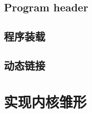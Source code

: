 \documentclass[a4paper,left=2.5cm,right=2.5cm,11pt]{article}
\begin{document}
\subsection{Program header}
\subsection{程序装载}
\subsection{动态链接}

\clearpage

\section{实现内核雏形}
\end{document}
